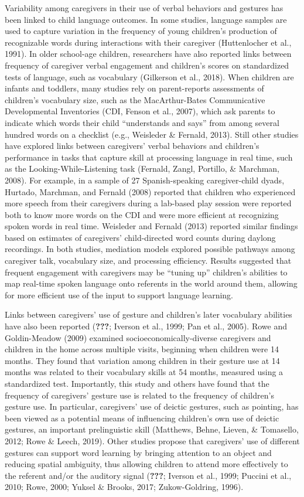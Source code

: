 \documentclass[
  english,
  man,mask]{apa6}
\begin{document}
Variability among caregivers in their use of verbal behaviors and gestures has been linked to child language outcomes. In some studies, language samples are used to capture variation in the frequency of young children's production of recognizable words during interactions with their caregiver (Huttenlocher et al., 1991). In older school-age children, researchers have also reported links between frequency of caregiver verbal engagement and children's scores on standardized tests of language, such as vocabulary (Gilkerson et al., 2018). When children are infants and toddlers, many studies rely on parent-reports assessments of children's vocabulary size, such as the MacArthur-Bates Communicative Developmental Inventories (CDI, Fenson et al., 2007), which ask parents to indicate which words their child \enquote{understands and says} from among several hundred words on a checklist (e.g., Weisleder \& Fernald, 2013). Still other studies have explored links between caregivers' verbal behaviors and children's performance in tasks that capture skill at processing language in real time, such as the Looking-While-Listening task (Fernald, Zangl, Portillo, \& Marchman, 2008). For example, in a sample of 27 Spanish-speaking caregiver-child dyads, Hurtado, Marchman, and Fernald (2008) reported that children who experienced more speech from their caregivers during a lab-based play session were reported both to know more words on the CDI and were more efficient at recognizing spoken words in real time. Weisleder and Fernald (2013) reported similar findings based on estimates of caregivers' child-directed word counts during daylong recordings. In both studies, mediation models explored possible pathways among caregiver talk, vocabulary size, and processing efficiency. Results suggested that frequent engagement with caregivers may be \enquote{tuning up} children's abilities to map real-time spoken language onto referents in the world around them, allowing for more efficient use of the input to support language learning.

Links between caregivers' use of gesture and children's later vocabulary abilities have also been reported ({\textbf{???}}; Iverson et al., 1999; Pan et al., 2005). Rowe and Goldin-Meadow (2009) examined socioeconomically-diverse caregivers and children in the home across multiple visits, beginning when children were 14 months. They found that variation among children in their gesture use at 14 months was related to their vocabulary skills at 54 months, measured using a standardized test. Importantly, this study and others have found that the frequency of caregivers' gesture use is related to the frequency of children's gesture use. In particular, caregivers' use of deictic gestures, such as pointing, has been viewed as a potential means of influencing children's own use of deictic gestures, an important prelinguistic skill (Matthews, Behne, Lieven, \& Tomasello, 2012; Rowe \& Leech, 2019). Other studies propose that caregivers' use of different gestures can support word learning by bringing attention to an object and reducing spatial ambiguity, thus allowing children to attend more effectively to the referent and/or the auditory signal ({\textbf{???}}; Iverson et al., 1999; Puccini et al., 2010; Rowe, 2000; Yuksel \& Brooks, 2017; Zukow-Goldring, 1996).
\end{document}
